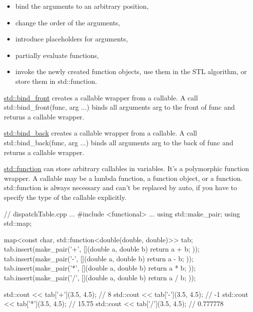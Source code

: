\begin{itemize}
\item 
bind the arguments to an arbitrary position,

\item 
change the order of the arguments,

\item 
introduce placeholders for arguments,

\item 
partially evaluate functions,

\item 
invoke the newly created function objects, use them in the STL algorithm, or store them in std::function.
\end{itemize}


\href{https://en.cppreference.com/w/cpp/utility/functional/bind_front}{std::bind\_front} creates a callable wrapper from a callable. A call std::bind\_front(func, arg ...) binds all arguments arg to the front of func and returns a callable wrapper.



\href{https://en.cppreference.com/w/cpp/utility/functional/bind_front}{std::bind\_back} creates a callable wrapper from a callable. A call std::bind\_back(func, arg ...) binds all arguments arg to the back of func and returns a callable wrapper.


\href{http://en.cppreference.com/w/cpp/utility/functional/function}{std::function} can store arbitrary callables in variables. It’s a polymorphic function wrapper. A callable may be a lambda function, a function object, or a function. std::function is always necessary and can’t be replaced by auto, if you have to specify the type of the callable explicitly.


\begin{cpp}
// dispatchTable.cpp
...
#include <functional>
...
using std::make_pair;
using std::map;

map<const char, std::function<double(double, double)>> tab;
tab.insert(make_pair('+', [](double a, double b){ return a + b; }));
tab.insert(make_pair('-', [](double a, double b){ return a - b; }));
tab.insert(make_pair('*', [](double a, double b){ return a * b; }));
tab.insert(make_pair('/', [](double a, double b){ return a / b; }));

std::cout << tab['+'](3.5, 4.5); // 8
std::cout << tab['-'](3.5, 4.5); // -1
std::cout << tab['*'](3.5, 4.5); // 15.75
std::cout << tab['/'](3.5, 4.5); // 0.777778
\end{cpp}

